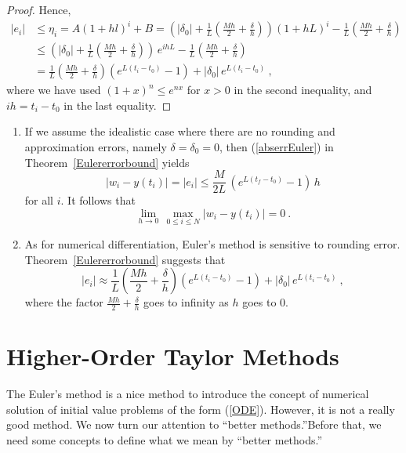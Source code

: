 \begin{proof}
Hence,
\begin{align*}
|e_i| & \leq \eta_i = A(1+hl)^i + B
= \left( |\delta_0| + \frac{1}{L}\left(\frac{Mh}{2} +
\frac{\delta}{h} \right)\right)\left(1+hL\right)^i -
\frac{1}{L}\left(\frac{Mh}{2} + \frac{\delta}{h}\right) \\
 &\leq \left( |\delta_0| + \frac{1}{L}\left(\frac{Mh}{2} +
\frac{\delta}{h} \right)\right)\,e^{ihL} -
\frac{1}{L}\left(\frac{Mh}{2} + \frac{\delta}{h}\right) \\
&= \frac{1}{L}\left(\frac{Mh}{2} + \frac{\delta}{h} \right)\left(
e^{L(t_i-t_0)} - 1 \right) + |\delta_0|\,e^{L(t_i-t_0)} \ ,
\end{align*}
where we have used $(1+x)^n \leq e^{nx}$ for $x > 0$ in the second
inequality, and $ih = t_i -t_0$ in the last equality.
\end{proof}

\begin{rmkList}
\begin{enumerate}
\item If we assume the idealistic case where there are no rounding
and approximation errors, namely $\delta = \delta_0 = 0$, then
(\ref{abserrEuler}) in Theorem~\ref{Eulererrorbound} yields
\[
  |w_i - y(t_i)| = |e_i| \leq \frac{M}{2L}\,\left(e^{L(t_f-t_0)} -1\right)\, h
\]
for all $i$.  It follows that
\[
  \lim_{h\to 0} \, \max_{0\leq i \leq N} |w_i - y(t_i)| = 0 \ .
\]
\item As for numerical differentiation, Euler's method is sensitive
to rounding error.  Theorem~\ref{Eulererrorbound} suggests that
\[
|e_i| \approx \frac{1}{L}\left(\frac{Mh}{2} + \frac{\delta}{h} \right)\left(
e^{L(t_i-t_0)} - 1 \right) + |\delta_0|\,e^{L(t_i-t_0)} \ ,
\]
where the factor
$\displaystyle \frac{Mh}{2} + \frac{\delta}{h}$ goes to infinity as
$h$ goes to $0$.
\end{enumerate}
\end{rmkList}

\section{Higher-Order Taylor Methods}

The Euler's method is a nice method to introduce the concept of
numerical solution of initial value problems of the form (\ref{ODE}).
However, it is not a really good method.  We now turn our attention to
``better methods.''\quad  Before that, we need some concepts to define what
we mean by ``better methods.''

